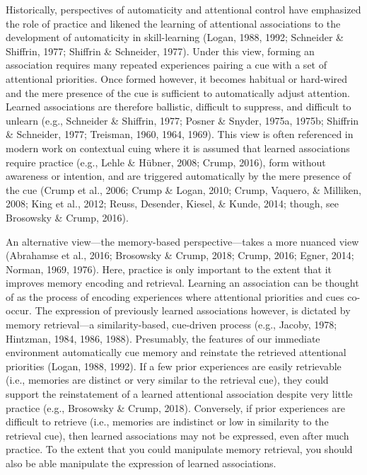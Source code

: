 \documentclass[english,,man,floatsintext]{apa6}
\begin{document}
Historically, perspectives of automaticity and attentional control have emphasized the role of practice and likened the learning of attentional associations to the development of automaticity in skill-learning (Logan, 1988, 1992; Schneider \& Shiffrin, 1977; Shiffrin \& Schneider, 1977). Under this view, forming an association requires many repeated experiences pairing a cue with a set of attentional priorities. Once formed however, it becomes habitual or hard-wired and the mere presence of the cue is sufficient to automatically adjust attention. Learned associations are therefore ballistic, difficult to suppress, and difficult to unlearn (e.g., Schneider \& Shiffrin, 1977; Posner \& Snyder, 1975a, 1975b; Shiffrin \& Schneider, 1977; Treisman, 1960, 1964, 1969). This view is often referenced in modern work on contextual cuing where it is assumed that learned associations require practice (e.g., Lehle \& Hübner, 2008; Crump, 2016), form without awareness or intention, and are triggered automatically by the mere presence of the cue (Crump et al., 2006; Crump \& Logan, 2010; Crump, Vaquero, \& Milliken, 2008; King et al., 2012; Reuss, Desender, Kiesel, \& Kunde, 2014; though, see Brosowsky \& Crump, 2016).

An alternative view---the memory-based perspective---takes a more nuanced view (Abrahamse et al., 2016; Brosowsky \& Crump, 2018; Crump, 2016; Egner, 2014; Norman, 1969, 1976). Here, practice is only important to the extent that it improves memory encoding and retrieval. Learning an association can be thought of as the process of encoding experiences where attentional priorities and cues co-occur. The expression of previously learned associations however, is dictated by memory retrieval---a similarity-based, cue-driven process (e.g., Jacoby, 1978; Hintzman, 1984, 1986, 1988). Presumably, the features of our immediate environment automatically cue memory and reinstate the retrieved attentional priorities (Logan, 1988, 1992). If a few prior experiences are easily retrievable (i.e., memories are distinct or very similar to the retrieval cue), they could support the reinstatement of a learned attentional association despite very little practice (e.g., Brosowsky \& Crump, 2018). Conversely, if prior experiences are difficult to retrieve (i.e., memories are indistinct or low in similarity to the retrieval cue), then learned associations may not be expressed, even after much practice. To the extent that you could manipulate memory retrieval, you should also be able manipulate the expression of learned associations.
\end{document}
